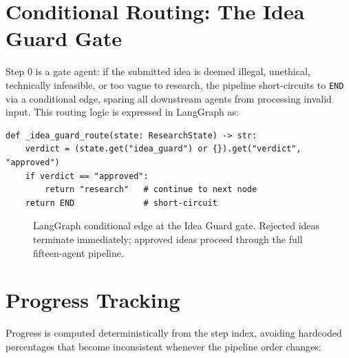 \documentclass[12pt,a4paper,oneside]{book}
\begin{document}
\section{Conditional Routing: The Idea Guard Gate}

Step 0 is a gate agent: if the submitted idea is deemed illegal, unethical, technically infeasible, or too vague to research, the pipeline short-circuits to \texttt{END} via a conditional edge, sparing all downstream agents from processing invalid input. This routing logic is expressed in LangGraph as:

\begin{lstlisting}[caption={Conditional routing after the Idea Guard node},label={lst:route}]
def _idea_guard_route(state: ResearchState) -> str:
    verdict = (state.get("idea_guard") or {}).get("verdict", "approved")
    if verdict == "approved":
        return "research"   # continue to next node
    return END              # short-circuit
\end{lstlisting}

\begin{figure}[H]
\centering
{}
\caption{LangGraph conditional edge at the Idea Guard gate. Rejected ideas terminate immediately; approved ideas proceed through the full fifteen-agent pipeline.}
\label{fig:idea_guard_route}
\end{figure}

\section{Progress Tracking}

Progress is computed deterministically from the step index, avoiding hardcoded percentages that become inconsistent whenever the pipeline order changes:
\end{document}
